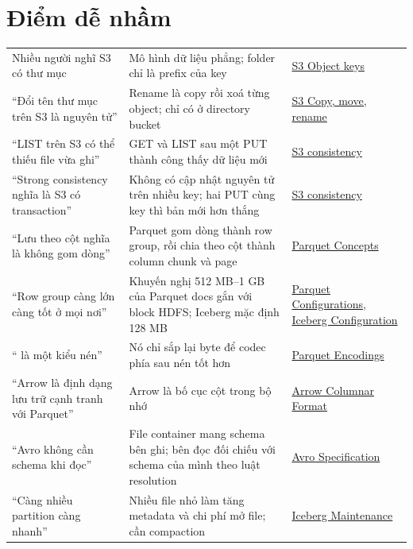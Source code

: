\section{Điểm dễ nhầm}
\begin{xltabular}{\textwidth}{@{}P{4.2cm} L P{3.2cm}@{}}
\toprule
{} &  &  \\
\midrule
\endhead
\bottomrule
\endfoot
Nhiều người nghĩ S3 có thư mục & Mô hình dữ liệu phẳng; folder chỉ là prefix của key & \href{https://docs.aws.amazon.com/AmazonS3/latest/userguide/object-keys.html}{S3 Object keys} \\
``Đổi tên thư mục trên S3 là nguyên tử'' & Rename là copy rồi xoá từng object;  chỉ có ở directory bucket & \href{https://docs.aws.amazon.com/AmazonS3/latest/userguide/copy-object.html}{S3 Copy, move, rename} \\
``LIST trên S3 có thể thiếu file vừa ghi'' & GET và LIST sau một PUT thành công thấy dữ liệu mới & \href{https://docs.aws.amazon.com/AmazonS3/latest/userguide/Welcome.html\#ConsistencyModel}{S3 consistency} \\
``Strong consistency nghĩa là S3 có transaction'' & Không có cập nhật nguyên tử trên nhiều key; hai PUT cùng key thì bản mới hơn thắng & \href{https://docs.aws.amazon.com/AmazonS3/latest/userguide/Welcome.html\#ConsistencyModel}{S3 consistency} \\
``Lưu theo cột nghĩa là không gom dòng'' & Parquet gom dòng thành row group, rồi chia theo cột thành column chunk và page & \href{https://parquet.apache.org/docs/concepts/}{Parquet Concepts} \\
``Row group càng lớn càng tốt ở mọi nơi'' & Khuyến nghị 512 MB--1 GB của Parquet docs gắn với block HDFS; Iceberg mặc định 128 MB & \href{https://parquet.apache.org/docs/file-format/configurations/}{Parquet Configurations}, \href{https://iceberg.apache.org/docs/latest/configuration/}{Iceberg Configuration} \\
`` là một kiểu nén'' & Nó chỉ sắp lại byte để codec phía sau nén tốt hơn & \href{https://parquet.apache.org/docs/file-format/data-pages/encodings/}{Parquet Encodings} \\
``Arrow là định dạng lưu trữ cạnh tranh với Parquet'' & Arrow là bố cục cột trong bộ nhớ & \href{https://arrow.apache.org/docs/format/Columnar.html}{Arrow Columnar Format} \\
``Avro không cần schema khi đọc'' & File container mang schema bên ghi; bên đọc đối chiếu với schema của mình theo luật resolution & \href{https://avro.apache.org/docs/1.11.1/specification/}{Avro Specification} \\
``Càng nhiều partition càng nhanh'' & Nhiều file nhỏ làm tăng metadata và chi phí mở file; cần compaction & \href{https://iceberg.apache.org/docs/latest/maintenance/}{Iceberg Maintenance} \\
\end{xltabular}
